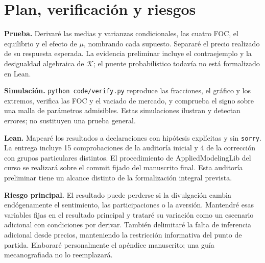 \documentclass[11pt]{article}
\begin{document}
\section{Plan, verificación y riesgos}
\textbf{Prueba.} Derivaré las medias y varianzas condicionales, las cuatro
FOC, el equilibrio y el efecto de $\mu$, nombrando cada supuesto.
Separaré el precio realizado de su respuesta esperada. La evidencia
preliminar incluye el contraejemplo y la desigualdad algebraica de
$\mathcal K$; el puente probabilístico todavía no está formalizado en Lean.

\textbf{Simulación.} \texttt{python code/verify.py} reproduce las fracciones,
el gráfico y los extremos, verifica las FOC y el vaciado de mercado, y
comprueba el signo sobre una malla de parámetros admisibles. Estas
simulaciones ilustran y detectan errores; no sustituyen una prueba general.

\textbf{Lean.} Mapearé los resultados a declaraciones con hipótesis
explícitas y sin \texttt{sorry}. La entrega incluye 15 comprobaciones de
la auditoría inicial y 4 de la corrección con grupos particulares distintos.
El procedimiento de AppliedModelingLib del curso se realizará sobre el
commit fijado del manuscrito final. Esta auditoría preliminar tiene un
alcance distinto de la formalización integral prevista.

\textbf{Riesgo principal.} El resultado puede perderse si la divulgación
cambia endógenamente el sentimiento, las participaciones o la aversión.
Mantendré esas variables fijas en el resultado principal y trataré su
variación como un escenario adicional con condiciones por derivar. También
delimitaré la falta de inferencia adicional desde precios, manteniendo
la restricción informativa del punto de partida. Elaboraré personalmente
el apéndice manuscrito; una guía mecanografiada no lo reemplazará.



\end{document}
